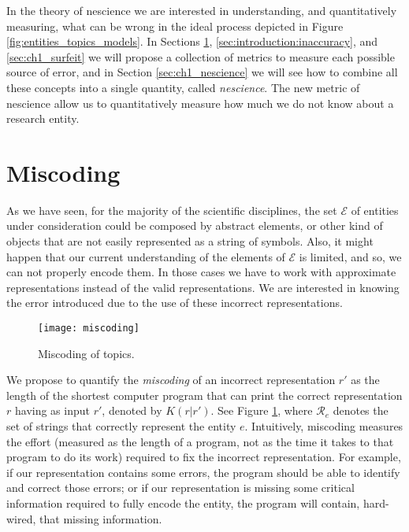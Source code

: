 In the theory of nescience we are interested in understanding, and quantitatively measuring, what can be wrong in the ideal process depicted in Figure \ref{fig:entities_topics_models}. In Sections \ref{sec:ch1_miscoding}, \ref{sec:introduction:inaccuracy}, and \ref{sec:ch1_surfeit} we will propose a collection of metrics to measure each possible source of error, and in Section \ref{sec:ch1_nescience} we will see how to combine all these concepts into a single quantity, called \emph{nescience}. The new metric of nescience allow us to quantitatively measure how much we do not know about a research entity.

%
%

\section{Miscoding}
\label{sec:ch1_miscoding}

As we have seen, for the majority of the scientific disciplines, the set $\mathcal{E}$ of entities under consideration could be composed by abstract elements, or other kind of objects that are not easily represented as a string of symbols. Also, it might happen that our current understanding of the elements of $\mathcal{E}$ is limited, and so, we can not properly encode them. In those cases we have to work with approximate representations instead of the valid representations. We are interested in knowing the error introduced due to the use of these incorrect representations.

\begin{figure}[h]
\centering\texttt{[image: miscoding]}
\caption{\label{fig:miscoding}Miscoding of topics.}
\end{figure}

We propose to quantify the \emph{miscoding} of an incorrect representation $r'$ as the length of the shortest computer program that can print the correct representation $r$ having as input $r'$, denoted by $K(r|r')$. See Figure \ref{fig:miscoding}, where $\mathcal{R}_e$ denotes the set of strings that correctly represent the entity $e$. Intuitively, miscoding measures the effort (measured as the length of a program, not as the time it takes to that program to do its work) required to fix the incorrect representation. For example, if our representation contains some errors, the program should be able to identify and correct those errors; or if our representation is missing some critical information required to fully encode the entity, the program will contain, hard-wired, that missing information.

